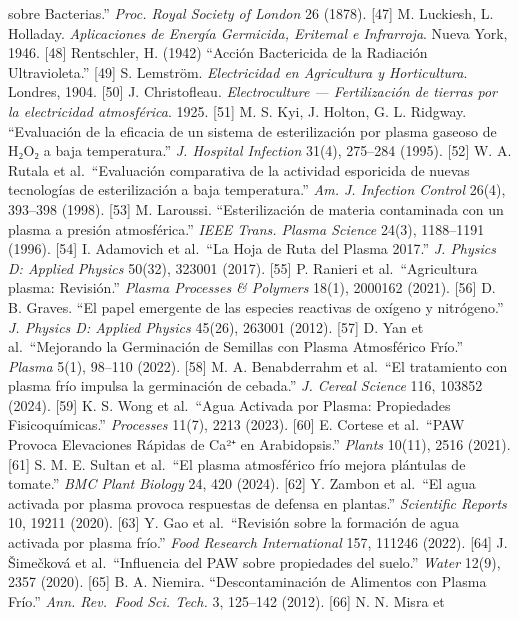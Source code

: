 \documentclass[
  10pt,
  letterpaper,
  twocolumn]{article}
\begin{document}
sobre Bacterias.'' \emph{Proc. Royal Society of London} 26 (1878).
{[}47{]} M. Luckiesh, L. Holladay. \emph{Aplicaciones de Energía
Germicida, Eritemal e Infrarroja}. Nueva York, 1946. {[}48{]}
Rentschler, H. (1942) ``Acción Bactericida de la Radiación
Ultravioleta.'' {[}49{]} S. Lemström. \emph{Electricidad en Agricultura
y Horticultura}. Londres, 1904. {[}50{]} J. Christofleau.
\emph{Electroculture --- Fertilización de tierras por la electricidad
atmosférica}. 1925. {[}51{]} M. S. Kyi, J. Holton, G. L. Ridgway.
``Evaluación de la eficacia de un sistema de esterilización por plasma
gaseoso de H₂O₂ a baja temperatura.'' \emph{J. Hospital Infection}
31(4), 275--284 (1995). {[}52{]} W. A. Rutala et al.~``Evaluación
comparativa de la actividad esporicida de nuevas tecnologías de
esterilización a baja temperatura.'' \emph{Am. J. Infection Control}
26(4), 393--398 (1998). {[}53{]} M. Laroussi. ``Esterilización de
materia contaminada con un plasma a presión atmosférica.'' \emph{IEEE
Trans. Plasma Science} 24(3), 1188--1191 (1996). {[}54{]} I. Adamovich
et al.~``La Hoja de Ruta del Plasma 2017.'' \emph{J. Physics D: Applied
Physics} 50(32), 323001 (2017). {[}55{]} P. Ranieri et al.~``Agricultura
plasma: Revisión.'' \emph{Plasma Processes \& Polymers} 18(1), 2000162
(2021). {[}56{]} D. B. Graves. ``El papel emergente de las especies
reactivas de oxígeno y nitrógeno.'' \emph{J. Physics D: Applied Physics}
45(26), 263001 (2012). {[}57{]} D. Yan et al.~``Mejorando la Germinación
de Semillas con Plasma Atmosférico Frío.'' \emph{Plasma} 5(1), 98--110
(2022). {[}58{]} M. A. Benabderrahm et al.~``El tratamiento con plasma
frío impulsa la germinación de cebada.'' \emph{J. Cereal Science} 116,
103852 (2024). {[}59{]} K. S. Wong et al.~``Agua Activada por Plasma:
Propiedades Fisicoquímicas.'' \emph{Processes} 11(7), 2213 (2023).
{[}60{]} E. Cortese et al.~``PAW Provoca Elevaciones Rápidas de Ca²⁺ en
Arabidopsis.'' \emph{Plants} 10(11), 2516 (2021). {[}61{]} S. M. E.
Sultan et al.~``El plasma atmosférico frío mejora plántulas de tomate.''
\emph{BMC Plant Biology} 24, 420 (2024). {[}62{]} Y. Zambon et al.~``El
agua activada por plasma provoca respuestas de defensa en plantas.''
\emph{Scientific Reports} 10, 19211 (2020). {[}63{]} Y. Gao et
al.~``Revisión sobre la formación de agua activada por plasma frío.''
\emph{Food Research International} 157, 111246 (2022). {[}64{]} J.
Šimečková et al.~``Influencia del PAW sobre propiedades del suelo.''
\emph{Water} 12(9), 2357 (2020). {[}65{]} B. A. Niemira.
``Descontaminación de Alimentos con Plasma Frío.'' \emph{Ann. Rev.~Food
Sci. Tech.} 3, 125--142 (2012). {[}66{]} N. N. Misra et
\end{document}
